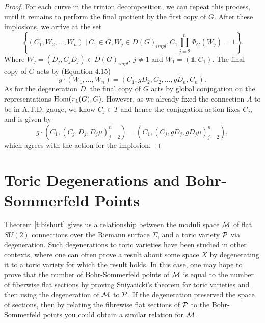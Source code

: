 \begin{proof}
		For each curve in the trinion decomposition, we can repeat this process, until it remains to perform the final quotient by the first copy of $G$. After these implosions, we arrive at the set
		\begin{equation}
			\left\{
			(C_1,W_2,...,W_n) ~|~ C_1 \in G, W_j \in D(G)_{impl}, C_1\prod_{j=2}^{n}\Phi_G(W_j) = 1	
			\right\}. 
		\end{equation}
		Where $W_j = (D_j,C_jD_j) \in D(G)_{impl}$, $j\neq 1$ and $W_1 = (\mathds{1},C_1)$. The final copy of $G$ acts by (Equation 4.15)
		\begin{equation}
			g\cdot(W_1,...,W_{n}) = (C_1,gD_2,C_2,...,gD_n, C_n). 
		\end{equation}
		As for the degeneration $D$, the final copy of $G$ acts by global conjugation on the representations $\text{Hom}(\pi_1(G),G)$. However, as we already fixed the connection $A$ to be in A.T.D. gauge, we know $C_j \in T$ and hence the conjugation action fixes $C_j$, and is given by
		\begin{equation}
			g \cdot (C_1,(C_j,D_j, D_j\mu)_{j=2}^n) = (C_1, (C_j, gD_j, gD_j\mu)_{j=2}^n),
		\end{equation}
		which agrees with the action for the implosion. 
	\end{proof}
	
	\section{Toric Degenerations and Bohr-Sommerfeld Points}
	
	Theorem \ref{t:bishurt} gives us a relationship between the moduli space $\mathcal{M}$ of flat $SU(2)$ connections over the Riemann surface $\Sigma$, and a toric variety $\mathcal{P}$ via degeneration. Such degenerations to toric varieties have been studied in other contexts, where one can often prove a result about some space $X$ by degenerating it to a toric variety for which the result holds. In this case, one may hope to prove that the number of Bohr-Sommerfeld points of $\mathcal{M}$ is equal to the number of fiberwise flat sections by proving Sniyaticki's theorem for toric varieties and then using the degeneration of $\mathcal{M}$ to $\mathcal{P}$. If the degeneration preserved the space of sections, then by relating the fibrewise flat sections of $\mathcal{P}$ to the Bohr-Sommerfeld points you could obtain a similar relation for $\mathcal{M}$. 
	
